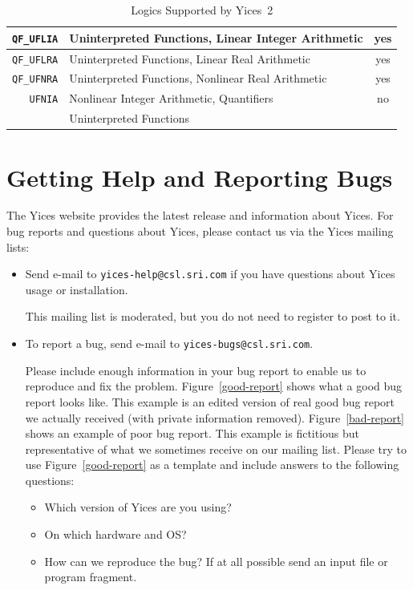 \documentclass[11pt,twoside,fleqn,openright,titlepage]{cslreport}
\begin{document}
\begin{table}
\begin{center}
\begin{tabular}{|r|l|c|}
\hline
\texttt{QF\_UFLIA} & Uninterpreted Functions, Linear Integer Arithmetic & yes \\
\hline
\texttt{QF\_UFLRA} & Uninterpreted Functions, Linear Real Arithmetic & yes \\
\hline
\texttt{QF\_UFNRA} & Uninterpreted Functions, Nonlinear Real Arithmetic & yes \\
\hline
\texttt{UFNIA} & Nonlinear Integer Arithmetic, Quantifiers & no \\
 & Uninterpreted Functions & \\
\hline
\end{tabular}
\end{center}
\caption{Logics Supported by Yices~2}
\label{supported-logics}
\end{table}

\newpage

\section{Getting Help and Reporting Bugs}

The Yices  website provides the  latest release and  information about
Yices.  For bug  reports and questions about Yices,  please contact us
via the Yices mailing lists:
\begin{itemize}
\item Send e-mail to \texttt{yices-help@csl.sri.com} if you have
  questions about Yices usage or installation.

   This mailing list is moderated, but you do not need to register to
   post to it.

\item To report a bug, send e-mail to \texttt{yices-bugs@csl.sri.com}.

  Please include enough information in your bug report to enable us to
  reproduce and fix the problem. Figure~\ref{good-report} shows what a
  good bug report looks like. This example is an edited version of
  real good bug report we actually received (with private information
  removed). Figure~\ref{bad-report} shows an example of poor bug
  report. This example is fictitious but representative of what we
  sometimes receive on our mailing list. Please try to use
  Figure~\ref{good-report} as a template and include answers to the
  following questions:
    \begin{itemize}
    \item Which version of Yices are you using?
    \item On which hardware and OS?
    \item How can we reproduce the bug? If at all possible send an input file
      or program fragment.
    \end{itemize}
\end{itemize}
\end{document}
